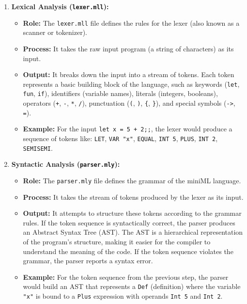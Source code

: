 \documentclass[a4paper,12pt]{article}
\begin{document}
\begin{enumerate}[left=0.5cm]
    \item \textbf{Lexical Analysis (\texttt{lexer.mll}):}
    \begin{itemize}[left=0.5cm]
        \item \textbf{Role:} The \texttt{lexer.mll} file defines the rules for the lexer (also known as a scanner or tokenizer).
        \item \textbf{Process:} It takes the raw input program (a string of characters) as its input.
        \item \textbf{Output:} It breaks down the input into a stream of tokens. Each token represents a basic building block of the language, such as keywords (\texttt{let}, \texttt{fun}, \texttt{if}), identifiers (variable names), literals (integers, booleans), operators (\texttt{+}, \texttt{-}, \texttt{*}, \texttt{/}), punctuation (\texttt{(}, \texttt{)}, \texttt{\{}, \texttt{\}}), and special symbols (\texttt{->}, \texttt{=}).
        \item \textbf{Example:} For the input \texttt{let x = 5 + 2;;}, the lexer would produce a sequence of tokens like: \texttt{LET}, \texttt{VAR "x"}, \texttt{EQUAL}, \texttt{INT 5}, \texttt{PLUS}, \texttt{INT 2}, \texttt{SEMISEMI}.
    \end{itemize}
    
    \item \textbf{Syntactic Analysis (\texttt{parser.mly}):}
    \begin{itemize}[left=0.5cm]
        \item \textbf{Role:} The \texttt{parser.mly} file defines the grammar of the miniML language.
        \item \textbf{Process:} It takes the stream of tokens produced by the lexer as its input.
        \item \textbf{Output:} It attempts to structure these tokens according to the grammar rules. If the token sequence is syntactically correct, the parser produces an Abstract Syntax Tree (AST). The AST is a hierarchical representation of the program's structure, making it easier for the compiler to understand the meaning of the code. If the token sequence violates the grammar, the parser reports a syntax error.
        \item \textbf{Example:} For the token sequence from the previous step, the parser would build an AST that represents a \texttt{Def} (definition) where the variable \texttt{"x"} is bound to a \texttt{Plus} expression with operands \texttt{Int 5} and \texttt{Int 2}.
    \end{itemize}
    

\end{enumerate}
\end{document}

